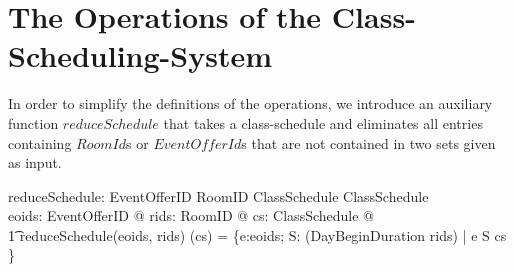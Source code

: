 \documentclass[a4paper]{article}
\begin{document}
\section{The Operations of the Class-Scheduling-System}

\vspace{1ex}\noindent 
In order to simplify the definitions of the operations, we introduce an
auxiliary function $reduceSchedule$ that takes a class-schedule and eliminates
all entries containing $RoomId$s or $EventOfferId$s that are not contained in
two sets given as input.
\begin{axdef}
  reduceSchedule: \power EventOfferID \cross \power RoomID \fun ClassSchedule
  \fun ClassSchedule \\ 
  \where
  \forall eoids: \power EventOfferID @ \forall rids: \power RoomID @ \forall cs:
  ClassSchedule @ \\
  \t1 reduceSchedule(eoids, rids) (cs) = \{e:eoids; S: \power (DayBeginDuration
  \cross rids) | e \mapsto S \in cs \} \\
\end{axdef}
\end{document}
